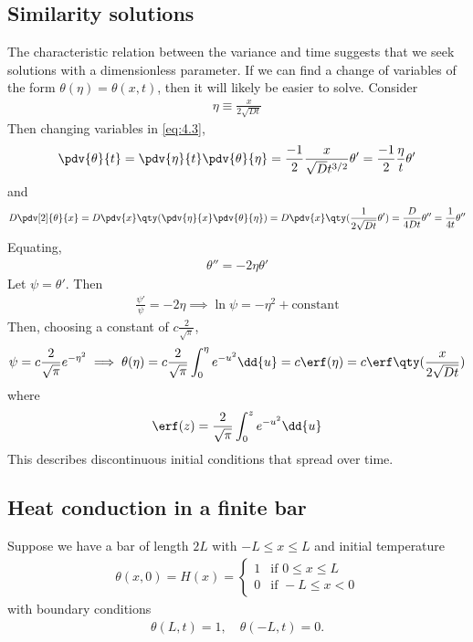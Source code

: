 \subsection{Similarity solutions}
The characteristic relation between the variance and time suggests that we seek solutions with a dimensionless parameter.
If we can find a change of variables of the form $\theta(\eta) = \theta(x,t)$, then it will likely be easier to solve.
Consider
\begin{align} \label{eq:4.5}
	\eta \equiv \frac{x}{2\sqrt{Dt}}
\end{align}
Then changing variables in \cref{eq:4.3},
\begin{align*}
	\pdv{\theta}{t} = \pdv{\eta}{t} \pdv{\theta}{\eta} = \frac{-1}{2} \frac{x}{\sqrt{D} t^{3/2}} \theta' = \frac{-1}{2} \frac{\eta}{t} \theta'
\end{align*}
and
\begin{align*}
	D \pdv[2]{\theta}{x} = D \pdv{x} \qty(\pdv{\eta}{x} \pdv{\theta}{\eta}) = D \pdv{x} \qty(\frac{1}{2\sqrt{Dt}} \theta') = \frac{D}{4Dt} \theta'' = \frac{1}{4t} \theta''
\end{align*}
Equating,
\begin{align} \label{eq:4.6}
	\theta'' = -2 \eta \theta'
\end{align}
Let $\psi = \theta'$.
Then
\begin{align*}
	\frac{\psi'}{\psi} = -2\eta \implies \ln \psi = -\eta^2 + \text{constant}
\end{align*}
Then, choosing a constant of $c\frac{2}{\sqrt{\pi}}$,
\begin{align} \label{eq:4.7}
	\psi = c\frac{2}{\sqrt{\pi}} e^{-\eta^2} \implies \theta(\eta) = c\frac{2}{\sqrt{\pi}} \int_0^\eta e^{-u^2} \dd{u} = c \erf(\eta) = c \erf \qty(\frac{x}{2\sqrt{Dt}})
\end{align}
where
\begin{align*}
	\erf(z) = \frac{2}{\sqrt{\pi}} \int_0^z e^{-u^2} \dd{u}
\end{align*}
This describes discontinuous initial conditions that spread over time.

\begingroup
{}

\endgroup

\subsection{Heat conduction in a finite bar}
Suppose we have a bar of length $2L$ with $-L \leq x \leq L$ and initial temperature
\begin{align} \label{eq:4.8}
	\theta(x,0) = H(x) = \begin{cases}
		1 & \text{if } 0 \leq x \leq L \\
		0 & \text{if } -L \leq x < 0
	\end{cases}
\end{align}
with boundary conditions
\begin{align} \label{eq:4.9}
    \theta(L, t) = 1, \quad \theta(-L, t) = 0.
\end{align}

